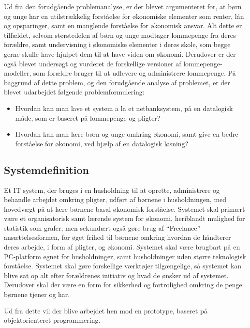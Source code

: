 Ud fra den forudgående problemanalyse, er der blevet argumenteret for, at børn og unge har en utilstrækkelig forståelse for økonomiske elementer som renter, lån og opsparinger, samt en manglende forståelse for økonomisk ansvar. Alt dette er tilfældet, selvom størstedelen af børn og unge modtager lommepenge fra deres forældre, samt undervisning i økonomiske elementer i deres skole, som begge gerne skulle have hjulpet dem til at have viden om økonomi. Derudover er der også blevet undersøgt og vurderet de forskellige versioner af lommepenge-modeller, som forældre bruger til at udlevere og administrere lommepenge. På baggrund af dette problem, og den forudgående analyse af problemet, er der blevet udarbejdet følgende problemformulering:

\begin{itemize}

	\item Hvordan kan man lave et system a la et netbanksystem, på en datalogisk måde, som er baseret på lommepenge og pligter?
	\item Hvordan kan man lære børn og unge omkring økonomi, samt give en bedre forståelse for økonomi, ved hjælp af en datalogisk løsning?

\end{itemize}

\subsection{Systemdefinition}
Et IT system, der bruges i en husholdning til at oprette, administrere og behandle arbejdet omkring pligter, udført af børnene i husholdningen, med hovedvægt på at lære børnene basal økonomisk forståelse. Systemet skal primært være et organisatorisk samt lærende system for økonomi, heriblandt mulighed for statistik som grafer, men sekundært også gøre brug af “Freelance” ansættelsesformen, for øget frihed til børnene omkring hvordan de håndterer deres arbejde, i form af pligter, og økonomi. Systemet skal være brugbart på en PC-platform egnet for husholdninger, samt husholdninger uden større teknologisk forståelse. Systemet  skal gøre forskellige værktøjer tilgængelige, så systemet kan blive sat op alt efter forældrenes initiativ og hvad de ønsker ud af systemet. Derudover skal der være en form for sikkerhed og fortrolighed omkring de penge børnene tjener og har.

Ud fra dette vil der blive arbejdet hen mod en prototype, baseret på objektorienteret programmering.